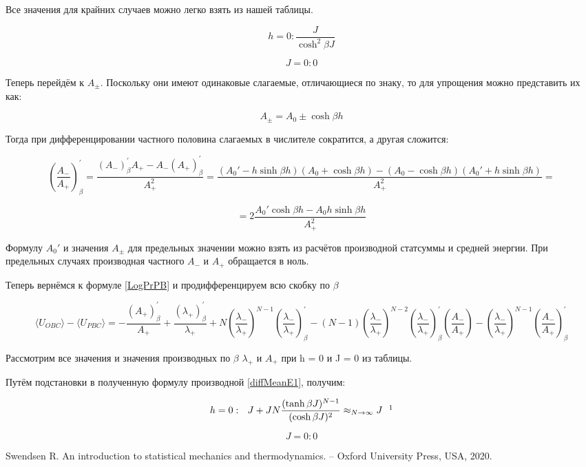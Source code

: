 \documentclass{article}
\newcommand{\bj}{\beta J}
\newcommand{\bh}{\beta h}
\newcommand{\lp}{\lambda_{+}}
\newcommand{\lm}{\lambda_{-}}
\newcommand{\ap}{A_{+}}
\newcommand{\am}{A_{-}}
\newcommand{\apm}{A_{\pm}}
\newcommand{\pbc}{_{PBC}}
\newcommand{\obc}{_{OBC}}
\newcommand{\prpb}{^{'}_{\beta}}
\newcommand{\la}{\langle}
\newcommand{\ra}{\rangle}
\numberwithin{equation}{section}
\begin{document}
Все значения для крайних случаев можно легко взять из нашей таблицы.

\[ h = 0: \frac{J}{\cosh^{2}\bj} \]

\[ J = 0: 0 \]

Теперь перейдём к $\apm$. Поскольку они имеют одинаковые слагаемые, отличающиеся по знаку, то для упрощения можно представить их как:

\[ \apm = A_{0} \pm \cosh{\bh} \]

Тогда при дифференцировании частного половина слагаемых в числителе сократится, а другая сложится:

\[ (\frac{\am}{\ap})\prpb = \frac{(\am)\prpb\ap-\am(\ap)\prpb}{\ap^{2}} = \frac{(A_{0}' - h\sinh{\bh})(A_{0} + \cosh{\bh}) - (A_{0} - \cosh{\bh})(A_{0}'+ h\sinh{\bh})}{\ap^{2}} = \]

\[ = 2\frac{A_{0}'\cosh{\bh} - A_{0}h\sinh{\bh}}{\ap^{2}}\]

Формулу $A_{0}'$ и значения $\apm$ для предельных значении можно взять из расчётов производной статсуммы и средней энергии. При предельных случаях производная частного $\am$ и $\ap$ обращается в ноль.

Теперь вернёмся к формуле \eqref{LogPrPB} и продифференцируем всю скобку по $\beta$

\begin{equation}\label{diffMeanE1}
    \la U\obc \ra - \la U\pbc \ra = -\frac{(\ap)\prpb}{\ap} + \frac{(\lp)\prpb}{\lp} + N(\frac{\lm}{\lp})^{N-1}(\frac{\lm}{\lp})\prpb - (N-1)(\frac{\lm}{\lp})^{N-2}(\frac{\lm}{\lp})\prpb(\frac{\am}{\ap}) - (\frac{\lm}{\lp})^{N-1}(\frac{\am}{\ap})\prpb
\end{equation}

Рассмотрим все значения и значения производных по $\beta$ $ \lambda_{+}$ и $A_{+}$ при h = 0 и J = 0 из таблицы.

Путём подстановки в полученную формулу производной \eqref{diffMeanE1}, получим:

\[ h = 0:\ \ J + JN\frac{(\tanh{\bj})^{N-1}}{(\cosh{\bj})^{2}} \approx_{N\to\infty} J\ \ \footnotemark\]

\[J = 0: 0\]

\begin{thebibliography}{9}
 Swendsen R. An introduction to statistical mechanics and thermodynamics. – Oxford University Press, USA, 2020.
\end{thebibliography}
\end{document}
